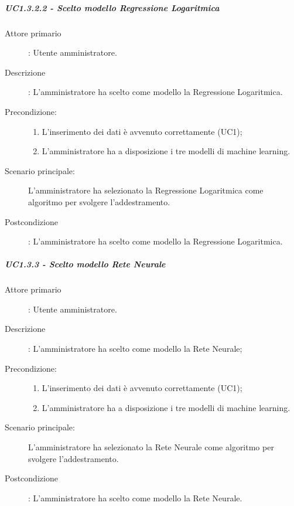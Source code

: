 \subparagraph*{UC1.3.2.2 - Scelto modello Regressione Logaritmica}
\label{sssec:uc1.3.2.2}
\begin{description}
  \item[Attore primario]: Utente amministratore.
  \item[Descrizione]: L'amministratore ha scelto come modello la Regressione Logaritmica.
  \item[Precondizione:]
  \begin{enumerate}
    \item L'inserimento dei dati è avvenuto correttamente (UC1);
    \item L'amministratore ha a disposizione i tre modelli di machine learning.
  \end{enumerate}
  \item[Scenario principale:] L'amministratore ha selezionato la Regressione Logaritmica come algoritmo per svolgere l'addestramento.
  \item[Postcondizione]: L'amministratore ha scelto come modello la Regressione Logaritmica.
\end{description}

\subparagraph{UC1.3.3 - Scelto modello Rete Neurale}
\label{sssec:uc1.3.3}
\begin{description}
  \item[Attore primario]: Utente amministratore.
  \item[Descrizione]: L'amministratore ha scelto come modello la Rete Neurale;
  \item[Precondizione:]
  \begin{enumerate}
    \item L'inserimento dei dati è avvenuto correttamente (UC1);
    \item L'amministratore ha a disposizione i tre modelli di machine learning.
  \end{enumerate}
  \item[Scenario principale:] L'amministratore ha selezionato la Rete Neurale come algoritmo per svolgere l'addestramento.
  \item[Postcondizione]: L'amministratore ha scelto come modello la Rete Neurale.
\end{description}



